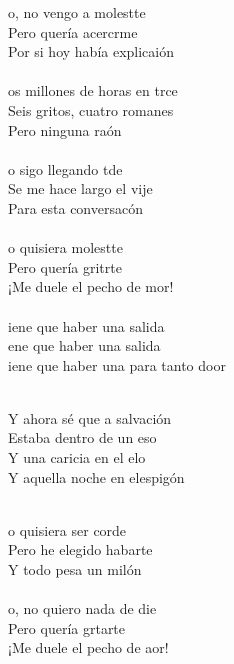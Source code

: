 \begin{cancion}%
	o, no vengo a molestte\\
	Pero quería acercrme\\
	Por si hoy había explicaión\\
\jump\\
	os millones de horas en trce\\
	Seis gritos, cuatro romanes\\
	Pero ninguna raón\\
\jump\\
	o sigo llegando tde\\
	Se me hace largo el vije\\
	Para esta conversacón\\
\jump\\
	o quisiera molestte\\
	Pero quería gritrte\\
	¡Me duele el pecho de mor!\\
\jump\\
	iene que haber una salida\\
	ene que haber una salida\\
	iene que haber una para tanto door\\\jump\\
	\begin{chorus}%
	Y ahora sé que a salvación\\
	Estaba dentro de un eso\\
	Y una caricia en el elo\\
	Y aquella noche en elespigón\\
	\end{chorus}%
	\jump\\
	o quisiera ser corde\\
	Pero he elegido habarte\\
	Y todo pesa un milón\\
\jump\\
	o, no quiero nada de die\\
	Pero quería grtarte\\
	¡Me duele el pecho de aor!\\

\end{cancion}
